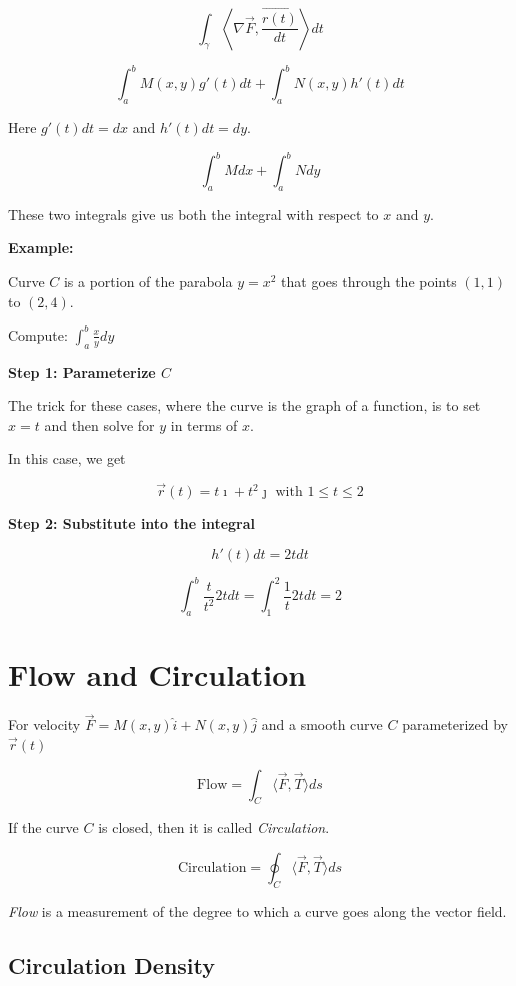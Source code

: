 \[
    \int_\gamma \left\langle \nabla \vec{F}, \frac{\vec{r(t)}}{dt} \right\rangle dt
\]

\[
    \int_{a}^{b} M(x,y)g'(t)dt + \int_{a}^{b} N(x,y)h'(t)dt
\]

Here \(g'(t)dt = dx\) and \(h'(t)dt = dy\).

\[
    \int_{a}^{b} Mdx + \int_{a}^{b} Ndy
\]

These two integrals give us both the integral with respect to \(x\) and \(y\).

\textbf{Example:}

Curve \(C\) is a portion of the parabola \(y = x^2\) that goes through the points \((1,1)\) to \((2,4)\).

Compute: \(\int_{a}^{b} \frac{x}{y} dy\)

\textbf{Step 1: Parameterize \(C\)}

The trick for these cases, where the curve is the graph of a function, is to set \(x = t\) and then solve for 
\(y\) in terms of \(x\).

In this case, we get

\[
    \vec{r}(t) = t\imath + t^2 \jmath \text{ with } 1 \le t \le 2
\]

\textbf{Step 2: Substitute into the integral}

\[
    h'(t)dt= 2t dt
\]

\[
    \int_{a}^{b} \frac{t}{t^2} 2tdt = \int_{1}^{2} \frac{1}{t} 2tdt = 2 
\]


\section{Flow and Circulation}

For velocity \(\vec{F} = M(x,y)\hat{i} + N(x,y)\hat{j}\) and a smooth curve \(C\) parameterized by \(\vec{r}(t)\)

\[
    \mathrm{Flow} = \int_C \langle \vec{F}, \vec{T} \rangle ds
\]


If the curve \(C\) is closed, then it is called \emph{Circulation}. 

\[
    \mathrm{Circulation} = \oint_C \langle \vec{F}, \vec{T} \rangle ds
\]

\emph{Flow} is a measurement of the degree to which a curve goes along the vector field.

\subsection{Circulation Density}

